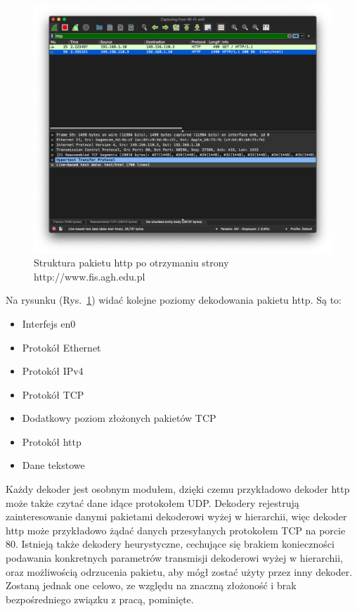 \documentclass[a4paper, 12pt, twoside, openright]{article}
\begin{document}
	\begin{figure}[h]
		\centering
			\includegraphics[width=1.0\textwidth]{img/screenshot_fis.png}
		\caption{Struktura pakietu http po otrzymaniu strony http://www.fis.agh.edu.pl}
		\label{fig:fis}
	\end{figure}

	Na rysunku (Rys.~\ref{fig:fis}) widać kolejne poziomy dekodowania pakietu http. Są to:

	\begin{itemize}
		\item Interfejs en0
		\item Protokół Ethernet
		\item Protokół IPv4
		\item Protokół TCP
		\item Dodatkowy poziom złożonych pakietów TCP
		\item Protokół http
		\item Dane tekstowe
	\end{itemize}

	Każdy dekoder jest osobnym modułem, dzięki czemu przykładowo dekoder http może także czytać dane idące protokołem UDP.
	Dekodery rejestrują zainteresowanie danymi pakietami dekoderowi wyżej w hierarchii, więc dekoder http może przykładowo
	żądać danych przesyłanych protokołem TCP na porcie 80. Istnieją także dekodery heurystyczne, cechujące się brakiem
	konieczności podawania konkretnych parametrów transmisji dekoderowi wyżej w hierarchii, oraz możliwością odrzucenia pakietu,
	aby mógł zostać użyty przez inny dekoder. Zostaną jednak one celowo, ze względu na znaczną złożoność i brak bezpośredniego
	związku z pracą, pominięte.
\end{document}
